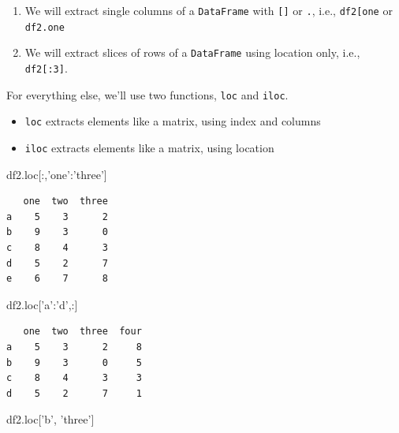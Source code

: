 \documentclass[
  letterpaper,
]{scrbook}
\newenvironment{Shaded}{\begin{snugshade}}{\end{snugshade}}
\newcommand{\NormalTok}[1]{#1}
\newcommand{\StringTok}[1]{\textcolor[rgb]{0.31,0.60,0.02}{#1}}
\providecommand{\tightlist}{%
  \setlength{\itemsep}{0pt}\setlength{\parskip}{0pt}}
\begin{document}
\begin{enumerate}
\def\labelenumi{\arabic{enumi}.}
\tightlist
\item
  We will extract single columns of a \texttt{DataFrame} with \texttt{{[}{]}} or \texttt{.}, i.e., \texttt{df2{[}\textquotesingle{}one\textquotesingle{}{]}} or \texttt{df2.one}
\item
  We will extract slices of rows of a \texttt{DataFrame} using location only, i.e., \texttt{df2{[}:3{]}}.
\end{enumerate}

For everything else, we'll use two functions, \texttt{loc} and \texttt{iloc}.

\begin{itemize}
\tightlist
\item
  \texttt{loc} extracts elements like a matrix, using index and columns
\item
  \texttt{iloc} extracts elements like a matrix, using location
\end{itemize}

\begin{Shaded}
\begin{Highlighting}[]
\NormalTok{df2.loc[:,}\StringTok{'one'}\NormalTok{:}\StringTok{'three'}\NormalTok{]}
\end{Highlighting}
\end{Shaded}

\begin{verbatim}
   one  two  three
a    5    3      2
b    9    3      0
c    8    4      3
d    5    2      7
e    6    7      8
\end{verbatim}

\begin{Shaded}
\begin{Highlighting}[]
\NormalTok{df2.loc[}\StringTok{'a'}\NormalTok{:}\StringTok{'d'}\NormalTok{,:]}
\end{Highlighting}
\end{Shaded}

\begin{verbatim}
   one  two  three  four
a    5    3      2     8
b    9    3      0     5
c    8    4      3     3
d    5    2      7     1
\end{verbatim}

\begin{Shaded}
\begin{Highlighting}[]
\NormalTok{df2.loc[}\StringTok{'b'}\NormalTok{, }\StringTok{'three'}\NormalTok{]}
\end{Highlighting}
\end{Shaded}
\end{document}
